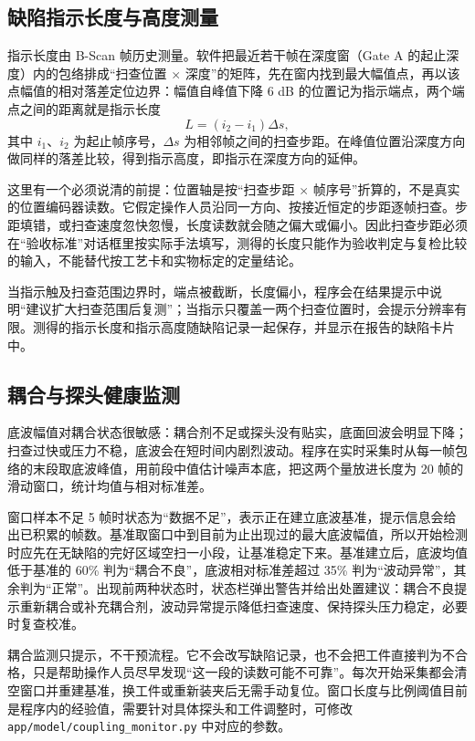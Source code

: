 \subsection{缺陷指示长度与高度测量}
\par
指示长度由 B-Scan 帧历史测量。软件把最近若干帧在深度窗（Gate A 的起止深度）内的包络排成“扫查位置 $\times$ 深度”的矩阵，先在窗内找到最大幅值点，再以该点幅值的相对落差定位边界：幅值自峰值下降 6 dB 的位置记为指示端点，两个端点之间的距离就是指示长度
\begin{equation}
	L=(i_2-i_1)\Delta s,
\end{equation}
其中 $i_1$、$i_2$ 为起止帧序号，$\Delta s$ 为相邻帧之间的扫查步距。在峰值位置沿深度方向做同样的落差比较，得到指示高度，即指示在深度方向的延伸。
\par
这里有一个必须说清的前提：位置轴是按“扫查步距 $\times$ 帧序号”折算的，不是真实的位置编码器读数。它假定操作人员沿同一方向、按接近恒定的步距逐帧扫查。步距填错，或扫查速度忽快忽慢，长度读数就会随之偏大或偏小。因此扫查步距必须在“验收标准”对话框里按实际手法填写，测得的长度只能作为验收判定与复检比较的输入，不能替代按工艺卡和实物标定的定量结论。
\par
当指示触及扫查范围边界时，端点被截断，长度偏小，程序会在结果提示中说明“建议扩大扫查范围后复测”；当指示只覆盖一两个扫查位置时，会提示分辨率有限。测得的指示长度和指示高度随缺陷记录一起保存，并显示在报告的缺陷卡片中。

\subsection{耦合与探头健康监测}
\par
底波幅值对耦合状态很敏感：耦合剂不足或探头没有贴实，底面回波会明显下降；扫查过快或压力不稳，底波会在短时间内剧烈波动。程序在实时采集时从每一帧包络的末段取底波峰值，用前段中值估计噪声本底，把这两个量放进长度为 20 帧的滑动窗口，统计均值与相对标准差。
\par
窗口样本不足 5 帧时状态为“数据不足”，表示正在建立底波基准，提示信息会给出已积累的帧数。基准取窗口中到目前为止出现过的最大底波幅值，所以开始检测时应先在无缺陷的完好区域空扫一小段，让基准稳定下来。基准建立后，底波均值低于基准的 60\% 判为“耦合不良”，底波相对标准差超过 35\% 判为“波动异常”，其余判为“正常”。出现前两种状态时，状态栏弹出警告并给出处置建议：耦合不良提示重新耦合或补充耦合剂，波动异常提示降低扫查速度、保持探头压力稳定，必要时复查校准。
\par
耦合监测只提示，不干预流程。它不会改写缺陷记录，也不会把工件直接判为不合格，只是帮助操作人员尽早发现“这一段的读数可能不可靠”。每次开始采集都会清空窗口并重建基准，换工件或重新装夹后无需手动复位。窗口长度与比例阈值目前是程序内的经验值，需要针对具体探头和工件调整时，可修改 \texttt{app/\allowbreak model/\allowbreak coupling\_\allowbreak monitor.py} 中对应的参数。

